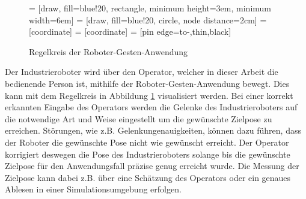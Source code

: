 \begin{figure}[!h]
     = [draw, fill=blue!20, rectangle, minimum height=3em, minimum width=6em]
     = [draw, fill=blue!20, circle, node distance=2cm]
     = [coordinate]
     = [coordinate]
     = [pin edge={to-,thin,black}]

    \centering
    \newline
    \caption[Regelkreis der Roboter-Gesten-Anwendung]{Regelkreis der Roboter-Gesten-Anwendung}
    \label{fig:regelkreis_tir}
\end{figure}\FloatBarrier

Der Industrieroboter wird über den Operator, welcher in dieser Arbeit die bedienende Person ist, mithilfe der Roboter-Gesten-Anwendung bewegt. Dies kann mit dem Regelkreis in Abbildung \ref{fig:regelkreis_tir} visualisiert werden. Bei einer korrekt erkannten Eingabe des Operators werden die Gelenke des Industrieroboters auf die notwendige Art und Weise eingestellt um die gewünschte Zielpose zu erreichen. Störungen, wie z.B. Gelenkungenauigkeiten, können dazu führen, dass der Roboter die gewünschte Pose nicht wie gewünscht erreicht. Der Operator korrigiert deswegen die Pose des Industrieroboters solange bis die gewünschte Zielpose für den Anwendungsfall präzise genug erreicht wurde. Die Messung der Zielpose kann dabei z.B. über eine Schätzung des Operators oder ein genaues Ablesen in einer Simulationsumgebung erfolgen.

